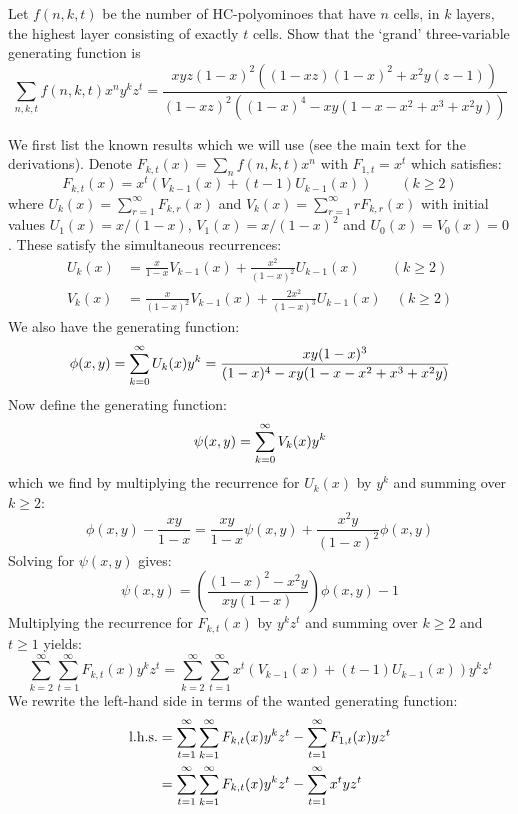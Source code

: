 \begin{exercise}
    Let $f(n,k,t)$ be the number of HC-polyominoes that have $n$ cells, in $k$ layers, the highest layer consisting of exactly $t$ cells. Show that the `grand' three-variable generating function is
    \[
        \sum_{n,k,t} f(n,k,t)x^ny^kz^t = \frac{xyz(1-x)^2((1-xz)(1-x)^2+x^2y(z-1))}{(1-xz)^2((1-x)^4-xy(1-x-x^2+x^3+x^2y))}
    \]
\end{exercise}
\begin{solution}
    We first list the known results which we will use (see the main text for the derivations). Denote $F_{k,t}(x) = \sum_n f(n,k,t)x^n$ with $F_{1,t} = x^t$ which satisfies:
    \[
        F_{k,t}(x) = x^t (V_{k-1}(x) +(t-1)U_{k-1}(x)) \qquad (k\geq 2)
    \]
    where $U_k(x) = \sum_{r=1}^\infty F_{k,r}(x)$ and $V_k(x)= \sum_{r=1}^\infty rF_{k,r}(x)$ with initial values $U_1(x) = x/(1-x)$, $V_1(x) = x/(1-x)^2$ and $U_0(x) = V_0(x) = 0$. These satisfy the simultaneous recurrences:
    \begin{align*}
        U_k(x) &= \frac{x}{1-x} V_{k-1}(x) + \frac{x^2}{(1-x)^2}U_{k-1}(x)  \qquad\mspace{3mu}(k\geq 2) \\
        V_k(x) &= \frac{x}{(1-x)^2}V_{k-1}(x) + \frac{2x^2}{(1-x)^3}U_{k-1}(x)\quad  (k\geq 2)
    \end{align*}
    We also have the generating function:
    \[
        \phi(x,y) = \bsum[k] U_k(x)y^k = \frac{xy(1-x)^3}{(1-x)^4-xy(1-x-x^2+x^3+x^2y)}
    \]
    Now define the generating function:
    \[
        \psi(x, y) = \bsum[k] V_k(x)y^k
    \]
    which we find by multiplying the recurrence for $U_k(x)$ by $y^k$ and summing over $k\geq 2$:
    \[
        \phi(x,y) - \frac{xy}{1-x} = \frac{xy}{1-x}\psi(x,y) + \frac{x^2y}{(1-x)^2}\phi(x,y)
    \]
    Solving for $\psi(x,y)$ gives:
    \[
        \psi(x,y) = \left(\frac{(1-x)^2 -x^2y}{xy(1-x)}\right)\phi(x,y) - 1
    \]
    Multiplying the recurrence for $F_{k,t}(x)$ by $y^kz^t$ and summing over $k\geq 2$ and $t\geq 1$ yields:
    \[
        \sum_{k=2}^\infty\sum_{t=1}^\infty F_{k,t}(x)y^kz^t =\sum_{k=2}^\infty\sum_{t=1}^\infty x^t(V_{k-1}(x) + (t-1)U_{k-1}(x))y^kz^t
    \]
    We rewrite the left-hand side in terms of the wanted generating function:
    \begin{align*}
        \textnormal{l.h.s.} &= \sum_{t=1}^\infty\sum_{k=1}^\infty F_{k,t}(x)y^kz^t  - \sum_{t=1}^\infty F_{1,t}(x)yz^t \\
        &= \sum_{t=1}^\infty\sum_{k=1}^\infty F_{k,t}(x)y^kz^t - \sum_{t=1}^\infty x^tyz^t \\

\end{align*}
\end{solution}
